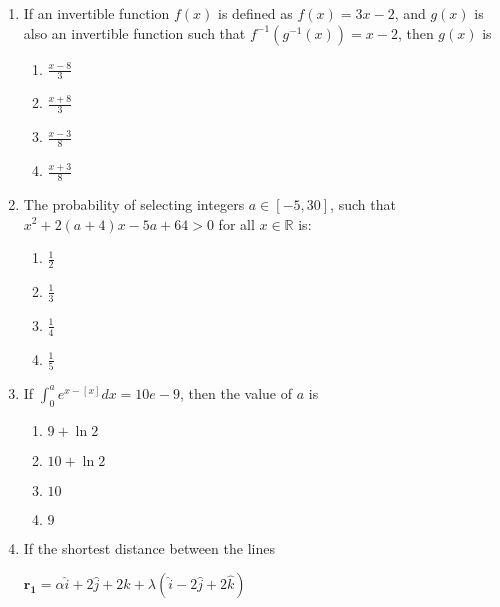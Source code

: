 \documentclass[journal]{IEEEtran}
\newcommand{\brak}[1]{\left( #1 \right)}
\newcommand{\sbrak}[1]{\left[ #1 \right]}
\newcommand{\gt}{>}
\begin{document}
\begin{enumerate}
    \item If an invertible function $f\brak{x}$ is defined as $f\brak{x} = 3x - 2$, and $g\brak{x}$ is also an invertible function such that $f^{-1}\brak{g^{-1}\brak{x}} = x - 2$, then $g\brak{x}$ is
    
        \begin{multicols}{4}
        \begin{enumerate}
        \item $\frac{x - 8}{3}$
        \item $\frac{x + 8}{3}$
        \item $\frac{x - 3}{8}$
        \item $\frac{x + 3}{8}$
        \end{enumerate}
        \end{multicols}
        
    \item The probability of selecting integers $a \in \sbrak{-5, 30}$, such that $x^2 + 2\brak{a + 4}x - 5a + 64 \gt 0$ for all $x \in \mathbb{R}$ is:
    
        \begin{multicols}{4}
        \begin{enumerate}
        \item $\frac{1}{2}$
        \item $\frac{1}{3}$
        \item $\frac{1}{4}$
        \item $\frac{1}{5}$
        \end{enumerate}
        \end{multicols}
        
    \item If $\int_0^a e^{x - \sbrak{x}} dx = 10e - 9$, then the value of $a$ is     
        \begin{multicols}{4}
        \begin{enumerate}
        \item $9 + \ln 2$
        \item $10 + \ln 2$
        \item $10$
        \item $9$
        \end{enumerate}
        \end{multicols}

    \item If the shortest distance between the lines

        $\mathbf{r_1} = \alpha \hat{i} + 2 \hat{j} + 2 \hat{k} + \lambda \brak{\hat{i} - 2 \hat{j} + 2 \hat{k}}$
        

\end{enumerate}
\end{document}
